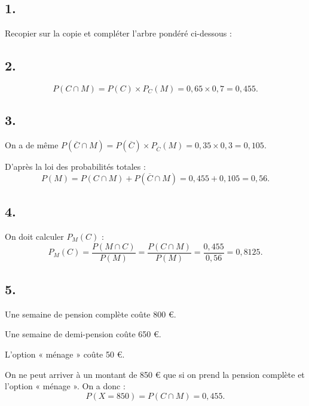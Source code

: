 \subsection*{1.}
	
	Recopier sur la copie et compléter l’arbre pondéré ci-dessous :
	
\begin{center}
\end{center}
	
	\subsection*{2.}
	
	\[
	P(C \cap M) = P(C) \times P_C(M) = 0,65 \times 0,7 = 0,455.
	\]
	
	\subsection*{3.}
	
	On a de même \(P(\overline{C} \cap M) = P(\overline{C}) \times P_{\overline{C}}(M) = 0,35 \times 0,3 = 0,105\).
	
	D’après la loi des probabilités totales :
	\[
	P(M) = P(C \cap M) + P(\overline{C} \cap M) = 0,455 + 0,105 = 0,56.
	\]
	
	\subsection*{4.}
	
	On doit calculer \(P_M(C)\) :
	\[
	P_M(C) = \dfrac{P(M \cap C)}{P(M)} = \dfrac{P(C \cap M)}{P(M)} = \dfrac{0,455}{0,56} = 0,8125.
	\]
	
	\subsection*{5.}
	
	Une semaine de pension complète coûte 800 €.
	
	Une semaine de demi-pension coûte 650 €.
	
	L’option « ménage » coûte 50 €.
	
	On ne peut arriver à un montant de 850 € que si on prend la pension complète et l’option « ménage ». On a donc :
	\[
	P(X = 850) = P(C \cap M) = 0,455.
	\]
